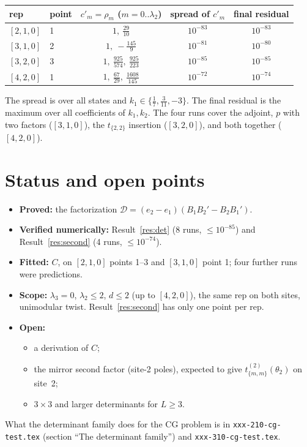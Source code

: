 \documentclass[11pt]{article}
\newcommand{\nb}[1]{\texttt{#1}}
\theoremstyle{definition}
\theoremstyle{remark}
\begin{document}
\begin{center}
\begin{tabular}{llccc}\toprule
rep & point & $c'_m=\rho_m$ ($m=0..\lambda_2$) & spread of $c'_m$ & final residual\\\midrule
$[2,1,0]$ & 1 & $1,\ \tfrac{29}{10}$ & $10^{-83}$ & $10^{-83}$\\
$[3,1,0]$ & 2 & $1,\ -\tfrac{145}{9}$ & $10^{-81}$ & $10^{-80}$\\
$[3,2,0]$ & 3 & $1,\ \tfrac{925}{574},\ \tfrac{925}{223}$ & $10^{-85}$ & $10^{-85}$\\
$[4,2,0]$ & 1 & $1,\ \tfrac{67}{29},\ \tfrac{1608}{145}$ & $10^{-72}$ & $10^{-74}$\\\bottomrule
\end{tabular}
\end{center}
The spread is over all states and $k_1\in\{\tfrac17,\tfrac3{11},-3\}$. The final residual is the maximum over all coefficients of $k_1,k_2$. The four runs cover the adjoint, $p$ with two factors ($[3,1,0]$), the $t_{\{2,2\}}$ insertion ($[3,2,0]$), and both together ($[4,2,0]$).

\section{Status and open points}
\begin{itemize}
\item \textbf{Proved:} the factorization $\mathcal D=(e_2-e_1)(B_1B_2'-B_2B_1')$.
\item \textbf{Verified numerically:} Result~\ref{res:det} (8 runs, $\le10^{-85}$) and Result~\ref{res:second} (4 runs, $\le10^{-74}$).
\item \textbf{Fitted:} $C$, on $[2,1,0]$ points 1--3 and $[3,1,0]$ point 1; four further runs were predictions.
\item \textbf{Scope:} $\lambda_3=0$, $\lambda_2\le2$, $d\le2$ (up to $[4,2,0]$), the same rep on both sites, unimodular twist. Result~\ref{res:second} has only one point per rep.
\item \textbf{Open:}
  \begin{itemize}
  \item a derivation of $C$;
  \item the mirror second factor (site-2 poles), expected to give $t^{(2)}_{\{m,m\}}(\theta_2)$ on site~2;
  \item $3\times3$ and larger determinants for $L\ge3$.
  \end{itemize}
\end{itemize}
What the determinant family does for the CG problem is in \nb{xxx-210-cg-test.tex} (section ``The determinant family'') and \nb{xxx-310-cg-test.tex}.
\end{document}
